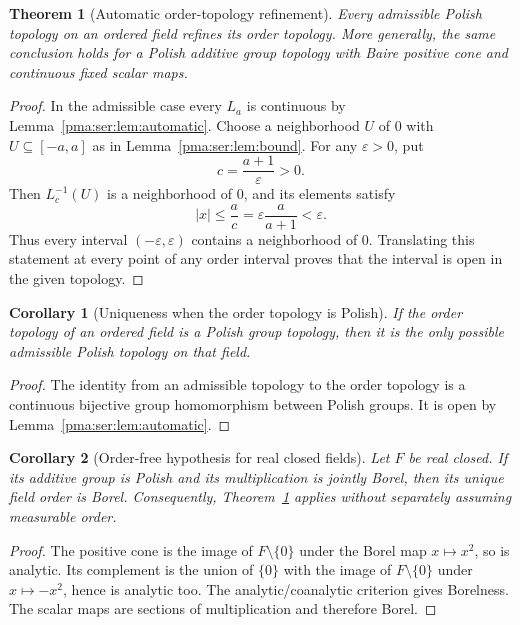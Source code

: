 \documentclass[11pt]{article}
\numberwithin{equation}{section}
\newtheorem{theorem}{Theorem}[section]
\newtheorem{corollary}[corollary]{Corollary}
\theoremstyle{definition}
\theoremstyle{remark}
\begin{document}
\begin{theorem}[Automatic order-topology refinement]\label{pma:ser:thm:refinement}
Every admissible Polish topology on an ordered field refines its order
topology. More generally, the same conclusion holds for a Polish additive
group topology with Baire positive cone and continuous fixed scalar maps.
\end{theorem}
\begin{proof}
In the admissible case every $L_a$ is continuous by
Lemma~\ref{pma:ser:lem:automatic}. Choose a neighborhood $U$ of $0$ with
$U\subseteq[-a,a]$ as in Lemma~\ref{pma:ser:lem:bound}. For any $\varepsilon>0$, put
\[
 c=\frac{a+1}{\varepsilon}>0.
\]
Then $L_c^{-1}(U)$ is a neighborhood of $0$, and its elements satisfy
\[
 |x|\leq\frac{a}{c}
 =\varepsilon\frac{a}{a+1}<\varepsilon.
\]
Thus every interval $(-\varepsilon,\varepsilon)$ contains a neighborhood of
$0$. Translating this statement at every point of any order interval proves
that the interval is open in the given topology.
\end{proof}

\begin{corollary}[Uniqueness when the order topology is Polish]
\label{pma:ser:cor:unique}
If the order topology of an ordered field is a Polish group topology, then it
is the only possible admissible Polish topology on that field.
\end{corollary}
\begin{proof}
The identity from an admissible topology to the order topology is a continuous
bijective group homomorphism between Polish groups. It is open by
Lemma~\ref{pma:ser:lem:automatic}.
\end{proof}

\begin{corollary}[Order-free hypothesis for real closed fields]
\label{pma:ser:cor:realorder}
Let $F$ be real closed. If its additive group is Polish and its multiplication
is jointly Borel, then its unique field order is Borel. Consequently,
Theorem~\ref{pma:ser:thm:refinement} applies without separately assuming measurable order.
\end{corollary}
\begin{proof}
The positive cone is the image of $F\setminus\{0\}$ under the Borel map
$x\mapsto x^2$, so is analytic. Its complement is the union of $\{0\}$ with
the image of $F\setminus\{0\}$ under $x\mapsto -x^2$, hence is analytic too.
The analytic/coanalytic criterion gives Borelness. The scalar maps are sections
of multiplication and therefore Borel.
\end{proof}
\end{document}
